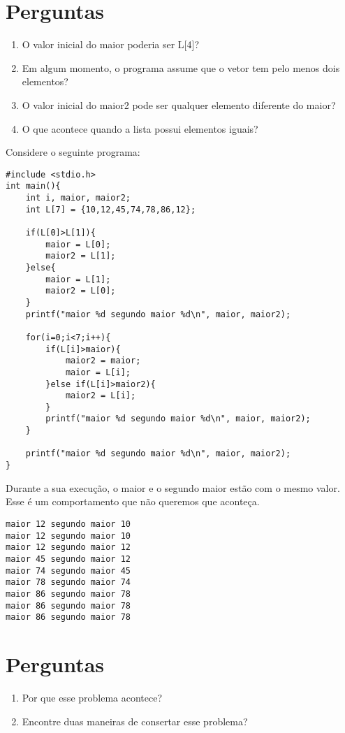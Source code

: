 \documentclass[a4paper,11pt]{article}
\begin{document}
\section*{Perguntas}

\begin{enumerate}
    \item O valor inicial do maior poderia ser L[4]?
    \item Em algum momento, o programa assume que o vetor tem pelo menos dois elementos?
    \item O valor inicial do maior2 pode ser qualquer elemento diferente do maior?
    \item O que acontece quando a lista possui elementos iguais?
\end{enumerate}

Considere o seguinte programa:

\begin{verbatim}
#include <stdio.h>
int main(){
	int i, maior, maior2;
	int L[7] = {10,12,45,74,78,86,12};
	
	if(L[0]>L[1]){
		maior = L[0];
		maior2 = L[1];
	}else{
		maior = L[1];
		maior2 = L[0];
	}
	printf("maior %d segundo maior %d\n", maior, maior2);
	
	for(i=0;i<7;i++){
		if(L[i]>maior){
			maior2 = maior;
			maior = L[i];
		}else if(L[i]>maior2){
			maior2 = L[i];
		}
		printf("maior %d segundo maior %d\n", maior, maior2);
	}
	
	printf("maior %d segundo maior %d\n", maior, maior2);
}
\end{verbatim}

Durante a sua execução, o maior e o segundo maior estão com o mesmo valor. Esse é um comportamento que não queremos que aconteça.

\begin{verbatim}
maior 12 segundo maior 10
maior 12 segundo maior 10
maior 12 segundo maior 12
maior 45 segundo maior 12
maior 74 segundo maior 45
maior 78 segundo maior 74
maior 86 segundo maior 78
maior 86 segundo maior 78
maior 86 segundo maior 78

\end{verbatim}

\section*{Perguntas}

\begin{enumerate}
    \item Por que esse problema acontece?
    \item Encontre duas maneiras de consertar esse problema?
\end{enumerate}
\end{document}
